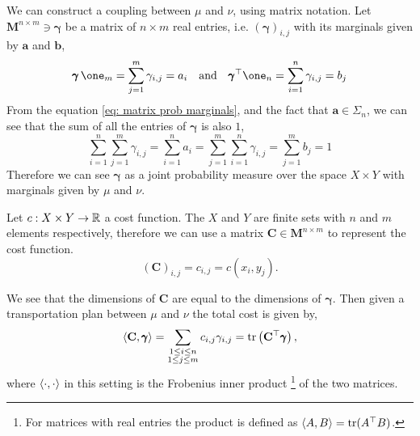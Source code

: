 We can construct a coupling between $\mu$ and $\nu$, using matrix notation. Let $\mathbf{M}^{n\times m}\ni\pmb{\gamma}$ be a matrix of $n\times m$ real entries, i.e. $(\pmb{\gamma})_{i,j}$ with its marginals given by $\mathbf{a}$ and $\mathbf{b}$,
\begin{align}
	 \pmb{\gamma}\, \one_m=\sum_{j=1}^{m}\gamma_{i,j}=a_i\quad \mand \quad \pmb{\gamma}^\top\one_n=\sum_{i=1}^{n}\gamma_{i,j}=b_j \label{eq: matrix prob marginals}
\end{align}
From the equation \ref{eq: matrix prob marginals},  and the fact that $\mathbf{a}\in\Sigma_n$, we can see that the sum of all the entries of $\pmb{\gamma}$ is also $1$,
\begin{equation}
 	\sum_{i=1}^{n}\sum_{j=1}^{m}\gamma_{i,j}=\sum_{i=1}^{n}a_i=\sum_{j=1}^{m}\sum_{i=1}^{n}\gamma_{i,j}=\sum_{j=1}^{m}b_j=1 
 \end{equation}
Therefore we can see $\pmb{\gamma}$ as a joint probability measure over the space $X\times Y$ with marginals given by $\mu$ and $\nu$.

Let $c:X\times Y \rightarrow \mathbb{R}$ a cost function. The $X$ and $Y$ are finite sets with $n$ and $m$ elements respectively, therefore we can use a matrix $\mathbf{C}\in \mathbf{M}^{n\times m}$ to represent the cost function.
\begin{equation}
	(\mathbf C)_{i,j}=c_{i,j}=c(x_i, y_j).
\end{equation}

We see that the dimensions of $\mathbf{C}$ are equal to the dimensions of $\pmb{\gamma}$. Then given a transportation plan between $\mu$ and $\nu$ the total cost is given by,
\begin{equation}
	\left\langle \mathbf{C}, \pmb{\gamma} \right\rangle=\sum_{\substack{1\leq i \leq n \\ 1\leq j\leq m}}c_{i,j}\gamma_{i,j}=\mathrm{tr}\left( \mathbf{C}^\top\pmb{\gamma} \right),
\end{equation}
where $\left\langle \cdot, \cdot \right\rangle$ in this setting is the Frobenius inner product \footnote{For matrices with real entries the product is defined as $\left\langle A, B \right\rangle=\mathrm{tr}(A^\top B)$.} of the two matrices.

